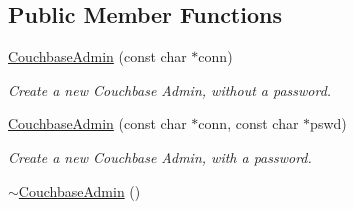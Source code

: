 \subsection*{Public Member Functions}
\begin{DoxyCompactItemize}
\item 
\hypertarget{classCouchbaseAdmin_a4a92b5209d65af9c9166b2fcb7aa6f07}{\hyperlink{classCouchbaseAdmin_a4a92b5209d65af9c9166b2fcb7aa6f07}{Couchbase\-Admin} (const char $\ast$conn)}\label{classCouchbaseAdmin_a4a92b5209d65af9c9166b2fcb7aa6f07}

\begin{DoxyCompactList}\small\item\em Create a new Couchbase Admin, without a password. \end{DoxyCompactList}\item 
\hypertarget{classCouchbaseAdmin_ab0ef48f5376cb28ddbd1a23f139ecb04}{\hyperlink{classCouchbaseAdmin_ab0ef48f5376cb28ddbd1a23f139ecb04}{Couchbase\-Admin} (const char $\ast$conn, const char $\ast$pswd)}\label{classCouchbaseAdmin_ab0ef48f5376cb28ddbd1a23f139ecb04}

\begin{DoxyCompactList}\small\item\em Create a new Couchbase Admin, with a password. \end{DoxyCompactList}\item 
\hypertarget{classCouchbaseAdmin_a1e762f3c30cf9e855258911d2f642a07}{\hyperlink{classCouchbaseAdmin_a1e762f3c30cf9e855258911d2f642a07}{$\sim$\-Couchbase\-Admin} ()}\label{classCouchbaseAdmin_a1e762f3c30cf9e855258911d2f642a07}


\end{DoxyCompactItemize}

